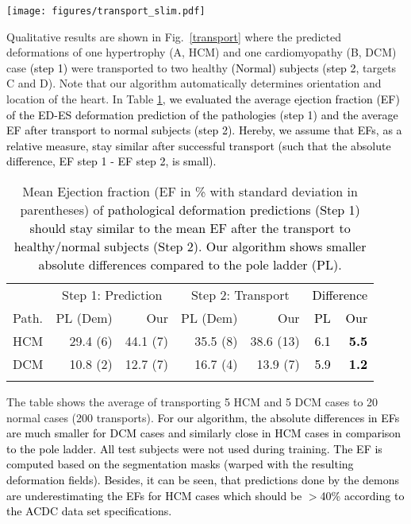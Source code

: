 \documentclass[journal]{IEEEtran}
\newcommand{\update}[1]{\textcolor{black}{#1}}
\begin{document}
\begin{figure*}[tb]
\centering 
\texttt{[image: figures/transport\_slim.pdf]}
\caption{\small{Transport pathological deformation predictions (\update{Step 1,} hypertrophy HCM, myopathy DCM) to healthy (Normal) subjects by using the pole ladder (with LCC-demons) and our probabilistic method \update{(Step 2)}. Note that the pole ladder algorithm requires the registration between pathological and normal subjects while our approach is able to rotate and translate deformations encoded in the latent space $z$ automatically.}}\label{transport}
\end{figure*}
Qualitative results are shown in Fig.~\ref{transport} where the predicted deformations of one hypertrophy (A, HCM) and one cardiomyopathy (B, DCM) case \update{(step 1)} were transported to two healthy \update{(Normal) subjects (step 2,} targets C and D). Note that our algorithm automatically determines orientation and location of the heart. In Table \ref{transportEFTable}, \update{we evaluated the average ejection fraction (EF) of the ED-ES deformation prediction of the pathologies (step 1) and the average EF after transport to normal subjects (step 2). Hereby, we assume that EFs, as a relative measure, stay similar after successful transport (such that the absolute difference, EF step 1 - EF step 2, is small).} 
\begin{table}[h]
\centering
\caption{\small{Mean Ejection fraction (EF in \% with standard deviation in parentheses) of \update{pathological deformation predictions (Step 1) should stay similar to the mean EF after the transport to healthy/normal subjects (Step 2). Our algorithm shows smaller absolute differences compared to the pole ladder (PL).}}}\label{transportEFTable}
\begin{tabular}{l|rr|rr|rr}
& \multicolumn{2}{c}{Step 1: Prediction} & \multicolumn{2}{c}{Step 2: Transport} & \multicolumn{2}{c}{\update{Difference}} \\
Path. & PL (Dem) & Our & PL (Dem) & Our & \update{PL} & \update{Our} \\
\hline
HCM & 29.4 (6) & 44.1 (7) & 35.5 (8) & 38.6 (13) & \update{6.1} & \update{\bf{5.5}}\\ 
DCM & 10.8 (2) & 12.7 (7) & 16.7 (4) & 13.9 (7) & \update{5.9} & \update{\bf{1.2}}\\ 
\noalign{\smallskip}
\hline
\end{tabular}
\end{table}
The table shows the average of transporting 5 HCM and 5 DCM cases to 20 normal cases (200 transports).
\update{For our algorithm, the absolute differences in EFs are much smaller for DCM cases and similarly close in HCM cases in comparison to the pole ladder. }\update{All test subjects were not used during training. The EF is computed based on the segmentation masks (warped with the resulting deformation fields). Besides, it can be seen, that predictions done by the demons are underestimating the EFs for HCM cases which should be $>$40\% according to the ACDC data set specifications.} 
\end{document}
